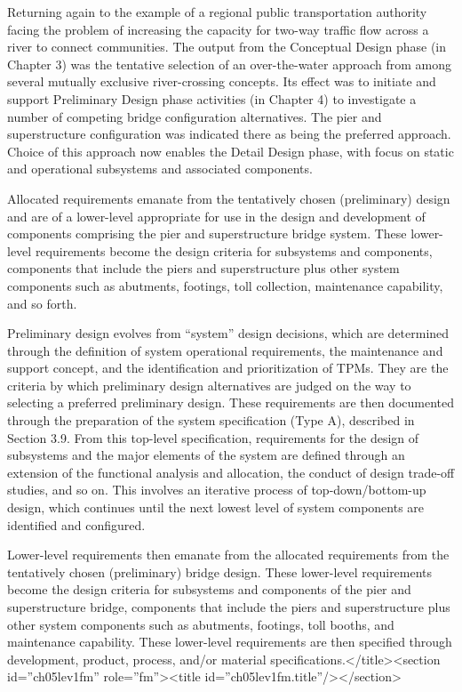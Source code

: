 Returning again to the example of a regional public transportation authority facing the problem of increasing the capacity for two-way traffic flow across a river to connect communities. The output from the Conceptual Design phase (in Chapter 3) was the tentative selection of an over-the-water approach from among several mutually exclusive river-crossing concepts. Its effect was to initiate and support Preliminary Design phase activities (in Chapter 4) to investigate a number of competing bridge configuration alternatives. The pier and superstructure configuration was indicated there as being the preferred approach. Choice of this approach now enables the Detail Design phase, with focus on static and operational subsystems and associated components.

Allocated requirements emanate from the tentatively chosen (preliminary) design and are of a lower-level appropriate for use in the design and development of components comprising the pier and superstructure bridge system. These lower-level requirements become the design criteria for subsystems and components, components that include the piers and superstructure plus other system components such as abutments, footings, toll collection, maintenance capability, and so forth.

Preliminary design evolves from ``system'' design decisions, which are determined through the definition of system operational requirements, the maintenance and support concept, and the identification and prioritization of TPMs. They are the criteria by which preliminary design alternatives are judged on the way to selecting a preferred preliminary design. These requirements are then documented through the preparation of the system specification (Type A), described in Section 3.9. From this top-level specification, requirements for the design of subsystems and the major elements of the system are defined through an extension of the functional analysis and allocation, the conduct of design trade-off studies, and so on. This involves an iterative process of top-down/bottom-up design, which continues until the next lowest level of system components are identified and configured.

Lower-level requirements then emanate from the allocated requirements from the tentatively chosen (preliminary) bridge design. These lower-level requirements become the design criteria for subsystems and components of the pier and superstructure bridge, components that include the piers and superstructure plus other system components such as abutments, footings, toll booths, and maintenance capability. These lower-level requirements are then specified through development, product, process, and/or material specifications.</title><section id=”ch05lev1fm” role=”fm”><title id=”ch05lev1fm.title”/></section>

